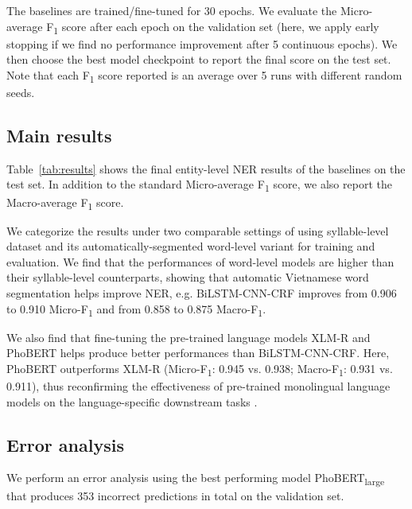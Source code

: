 \documentclass[11pt]{article}
\begin{document}
The baselines are trained/fine-tuned for 30 epochs. We evaluate the Micro-average F\textsubscript{1} score after each epoch on the validation set (here, we apply early stopping if we find no performance improvement after 5 continuous epochs). We then choose the best model checkpoint to report the final score on the test set. Note that each  F\textsubscript{1} score reported is an average over 5 runs with different random seeds. 

\subsection{Main results} 

Table~\ref{tab:results} shows the final entity-level NER results of the baselines on the test set. In addition to the standard Micro-average F\textsubscript{1} score, we also report the Macro-average F\textsubscript{1} score. 

We categorize the results under two comparable settings of using syllable-level dataset and its automatically-segmented word-level variant for training and evaluation. We find that the performances of word-level models are higher than their syllable-level counterparts, showing  that automatic Vietnamese word segmentation helps improve NER, e.g. BiLSTM-CNN-CRF improves from 0.906 to 0.910 Micro-F\textsubscript{1} and from 0.858 to 0.875 Macro-F\textsubscript{1}.  

We also find that fine-tuning the pre-trained language models XLM-R and PhoBERT helps produce better performances than BiLSTM-CNN-CRF. Here, PhoBERT outperforms XLM-R (Micro-F\textsubscript{1}: 0.945 vs. 0.938; Macro-F\textsubscript{1}: 0.931 vs. 0.911), thus reconfirming the effectiveness of pre-trained monolingual  language models on the language-specific downstream tasks \cite{nguyen2020phobert}. 

\subsection{Error analysis}
\label{analysis}


We perform an error analysis using the best performing model  PhoBERT\textsubscript{large} that produces 353 incorrect predictions in total on the validation set. 
\end{document}
